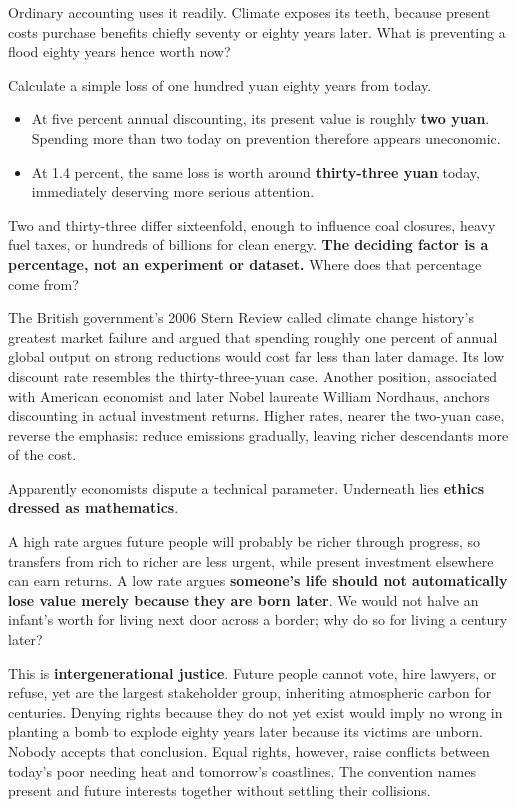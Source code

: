 Ordinary accounting uses it readily. Climate exposes its teeth, because present costs purchase benefits chiefly seventy or eighty years later. What is preventing a flood eighty years hence worth now?

Calculate a simple loss of one hundred yuan eighty years from today.

\begin{itemize}
\item At five percent annual discounting, its present value is roughly \textbf{two yuan}. Spending more than two today on prevention therefore appears uneconomic.
\item At 1.4 percent, the same loss is worth around \textbf{thirty-three yuan} today, immediately deserving more serious attention.
\end{itemize}
Two and thirty-three differ sixteenfold, enough to influence coal closures, heavy fuel taxes, or hundreds of billions for clean energy. \textbf{The deciding factor is a percentage, not an experiment or dataset.} Where does that percentage come from?

The British government's 2006 Stern Review called climate change history's greatest market failure and argued that spending roughly one percent of annual global output on strong reductions would cost far less than later damage. Its low discount rate resembles the thirty-three-yuan case. Another position, associated with American economist and later Nobel laureate William Nordhaus, anchors discounting in actual investment returns. Higher rates, nearer the two-yuan case, reverse the emphasis: reduce emissions gradually, leaving richer descendants more of the cost.

Apparently economists dispute a technical parameter. Underneath lies \textbf{ethics dressed as mathematics}.

A high rate argues future people will probably be richer through progress, so transfers from rich to richer are less urgent, while present investment elsewhere can earn returns. A low rate argues \textbf{someone's life should not automatically lose value merely because they are born later}. We would not halve an infant's worth for living next door across a border; why do so for living a century later?

This is \textbf{intergenerational justice}. Future people cannot vote, hire lawyers, or refuse, yet are the largest stakeholder group, inheriting atmospheric carbon for centuries. Denying rights because they do not yet exist would imply no wrong in planting a bomb to explode eighty years later because its victims are unborn. Nobody accepts that conclusion. Equal rights, however, raise conflicts between today's poor needing heat and tomorrow's coastlines. The convention names present and future interests together without settling their collisions.

